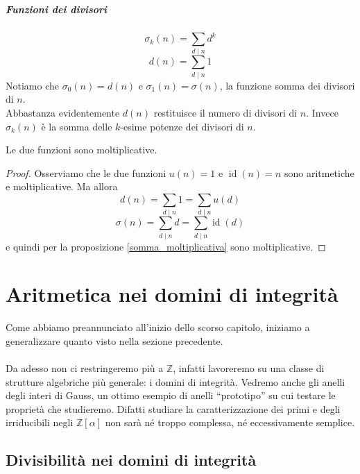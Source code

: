 \paragraph{Funzioni dei divisori}
\begin{equation*}
\sigma_k(n)=\sum_{d\mid n}d^k
\end{equation*}
\begin{equation*}
d(n)=\sum_{d\mid n}1
\end{equation*}
Notiamo che $\sigma_0(n)=d(n)$ e $\sigma_1(n)=\sigma(n)$, la funzione somma dei divisori di $n$. \\ Abbastanza evidentemente $d(n)$ restituisce il numero di divisori di $n$. Invece $\sigma_k(n)$ è la somma delle $k$-esime potenze dei divisori di $n$.
\begin{teorema}
	Le due funzioni sono moltiplicative.
\end{teorema}
\begin{proof}
	Osserviamo che le due funzioni $u(n)=1$ e $\operatorname{id}(n)=n$ sono aritmetiche e moltiplicative. Ma allora
	\begin{equation*}
	d(n)=\sum_{d\mid n}1=\sum_{d\mid n}u(d)
	\end{equation*}
	\begin{equation*}
	\sigma(n)=\sum_{d\mid n}d=\sum_{d\mid n}\operatorname{id}(d)
	\end{equation*}
	e quindi per la proposizione \ref{somma_moltiplicativa} sono moltiplicative.
\end{proof}




\chapter{Aritmetica nei domini di integrità}
\label{lezione3}
Come abbiamo preannunciato all'inizio dello scorso capitolo, iniziamo a generalizzare quanto visto nella sezione precedente. \\ \\ Da adesso non ci restringeremo più a $\mathbb{Z}$, infatti lavoreremo su una classe di strutture algebriche più generale: i domini di integrità. Vedremo anche gli anelli degli interi di Gauss, un ottimo esempio di anelli \enquote{prototipo} su cui testare le proprietà che studieremo. Difatti studiare la caratterizzazione dei primi e degli irriducibili negli $\mathbb{Z}[\alpha]$ non sarà né troppo complessa, né eccessivamente semplice.
\section{Divisibilità nei domini di integrità}
